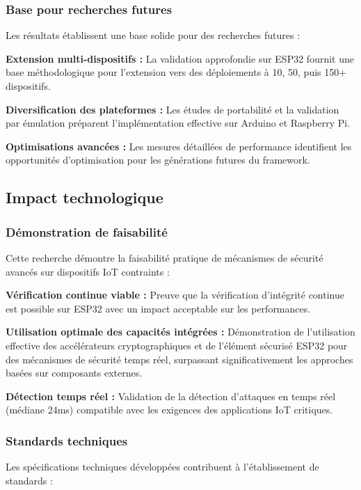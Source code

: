 \subsubsection{Base pour recherches futures}

Les résultats établissent une base solide pour des recherches futures :

\textbf{Extension multi-dispositifs :} La validation approfondie sur ESP32 fournit une base méthodologique pour l'extension vers des déploiements à 10, 50, puis 150+ dispositifs.

\textbf{Diversification des plateformes :} Les études de portabilité et la validation par émulation préparent l'implémentation effective sur Arduino et Raspberry Pi.

\textbf{Optimisations avancées :} Les mesures détaillées de performance identifient les opportunités d'optimisation pour les générations futures du framework.

\subsection{Impact technologique}

\subsubsection{Démonstration de faisabilité}

Cette recherche démontre la faisabilité pratique de mécanismes de sécurité avancés sur dispositifs IoT contraints :

\textbf{Vérification continue viable :} Preuve que la vérification d'intégrité continue est possible sur ESP32 avec un impact acceptable sur les performances.

\textbf{Utilisation optimale des capacités intégrées :} Démonstration de l'utilisation effective des accélérateurs cryptographiques et de l'élément sécurisé ESP32 pour des mécanismes de sécurité temps réel, surpassant significativement les approches basées sur composants externes.

\textbf{Détection temps réel :} Validation de la détection d'attaques en temps réel (médiane 24ms) compatible avec les exigences des applications IoT critiques.

\subsubsection{Standards techniques}

Les spécifications techniques développées contribuent à l'établissement de standards :

